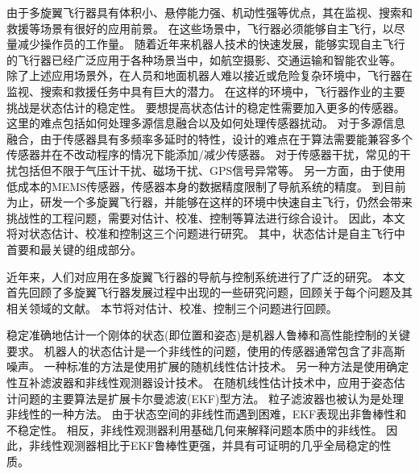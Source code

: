 \documentclass[
  type=master
]{gdutthesis}
\begin{document}

\gduttableofcontents

\mainmatter


由于多旋翼飞行器具有体积小、悬停能力强、机动性强等优点，其在监视、搜索和救援等场景有很好的应用前景。
在这些场景中，飞行器必须能够自主飞行，以尽量减少操作员的工作量。
随着近年来机器人技术的快速发展，能够实现自主飞行的飞行器已经广泛应用于各种场景当中，如航空摄影、交通运输和智能农业等。
除了上述应用场景外，在人员和地面机器人难以接近或危险复杂环境中，飞行器在监视、搜索和救援任务中具有巨大的潜力。
在这样的环境中，飞行器作业的主要挑战是状态估计的稳定性。
要想提高状态估计的稳定性需要加入更多的传感器。
这里的难点包括如何处理多源信息融合以及如何处理传感器扰动。
对于多源信息融合，由于传感器具有多频率多延时的特性，设计的难点在于算法需要能兼容多个传感器并在不改动程序的情况下能添加/减少传感器。
对于传感器干扰，常见的干扰包括但不限于气压计干扰、磁场干扰、GPS信号异常等。
另一方面，由于使用低成本的MEMS传感器，传感器本身的数据精度限制了导航系统的精度。
到目前为止，研发一个多旋翼飞行器，并能够在这样的环境中快速自主飞行，仍然会带来挑战性的工程问题，需要对估计、校准、控制等算法进行综合设计。
因此，本文将对状态估计、校准和控制这三个问题进行研究。
其中，状态估计是自主飞行中首要和最关键的组成部分。

近年来，人们对应用在多旋翼飞行器的导航与控制系统进行了广泛的研究。
本文首先回顾了多旋翼飞行器发展过程中出现的一些研究问题，回顾关于每个问题及其相关领域的文献。
本节将对估计、校准、控制三个问题进行回顾。

稳定准确地估计一个刚体的状态(即位置和姿态)是机器人鲁棒和高性能控制的关键要求。
机器人的状态估计是一个非线性的问题，使用的传感器通常包含了非高斯噪声\cite{baldwin2009inertial}。
一种标准的方法是使用扩展的随机线性估计技术\cite{lefferts1982kalman,barshan1995inertial}。
另一种方法是使用确定性互补滤波器和非线性观测器设计技术\cite{zimmermann1992high,baerveldt1997low,vik2001nonlinear}。
在随机线性估计技术中，应用于姿态估计问题的主要算法是扩展卡尔曼滤波(EKF)型方法。
粒子滤波器也被认为是处理非线性的一种方法\cite{cheng2004particle}。
由于状态空间的非线性而遇到困难，EKF表现出非鲁棒性和不稳定性\cite{crassidis2007survey}。
相反，非线性观测器利用基础几何来解释问题本质中的非线性。
因此，非线性观测器相比于EKF鲁棒性更强，并具有可证明的几乎全局稳定的性质\cite{thienel2003coupled,mahony2008nonlinear,lageman2009gradient,hua2010attitude,vasconcelos2010nonlinear}。
\end{document}
